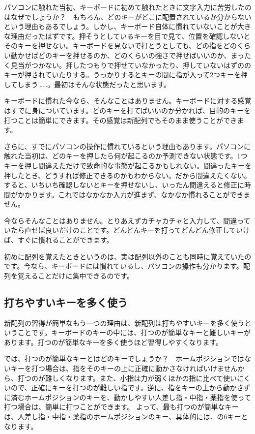 パソコンに触れた当初、キーボードに初めて触れたときに文字入力に苦労したのはなぜでしょうか？　もちろん、どのキーがどこに配置されているか分からないという理由もあるでしょう。しかし、キーボード自体に慣れていないことが大きな理由だったはずです。押そうとしているキーを目で見て、位置を確認しないとそのキーを押せない。キーボードを見ないで打とうとしても、どの指をどのくらい動かせばどのキーを押せるのか、どのくらいの強さで押せばいいのか、まったく見当がつかない。押したつもりで押せていなかったり、押していないはずののキーが押されていたりする。うっかりするとキーの間に指が入って2つキーを押してしまう……。最初はそんな状態だったと思います。

キーボードに慣れた今なら、そんなことはありません。キーボードに対する感覚はすでに身についています。どのキーを打てばいいのか分かれば、目的のキーを打つことは簡単にできます。その感覚は新配列でもそのまま使うことができます。

さらに、すでにパソコンの操作に慣れているという理由もあります。パソコンに触れた当初は、どのキーを押したら何が起こるのか予測できない状態です。1つキーを押し間違えただけで致命的な事態が起こるかもしれない。間違ったキーを押したとき、どうすれば修正できるのかもわからない。だから間違えたくない。すると、いちいち確認しないとキーを押せないし、いったん間違えると修正に時間がかかります。これではなかなか入力が進まず、なかなか慣れることができません。

今ならそんなことはありません。とりあえずカチャカチャと入力して、間違っていたら直せば良いだけのことです。どんどんキーを打ってどんどん修正していけば、すぐに慣れることができます。

初めに配列を覚えたときというのは、実は配列以外のことも同時に覚えていたのです。今なら、キーボードには慣れているし、パソコンの操作も分かります。配列を覚えることだけに集中できるのです。

\subsection{打ちやすいキーを多く使う}

新配列の習得が簡単なもう一つの理由は、新配列は打ちやすいキーを多く使うということです。キーボードのキーの中には、打つのが簡単なキーと難しいキーがあります。打つのが簡単なキーを多く使うほど習得しやすくなります。

では、打つのが簡単なキーとはどのキーでしょうか？　ホームポジションではないキーを打つ場合は、指をそのキーの上に正確に動かさなければいけませんから、打つのが難しくなります。また、小指は力が弱くほかの指に比べて使いにくいので、正確にキーを打つのが難しい指です。逆に、指をキーの上から動かさずに済むホームポジションのキーを、動かしやすい人差し指・中指・薬指を使って打つ場合は、簡単に打つことができます。
よって、最も打つのが簡単なキーは、人差し指・中指・薬指のホームポジションのキー、具体的には、の6キーとなります。

